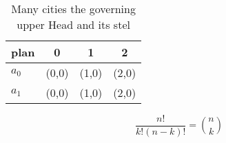 \documentclass[a4paper]{article}
\begin{document}
\begin{table}
\begin{adjustbox}{width=0.6\columnwidth}
\begin{tabular}{|l|l|l|l|}
\hline
\textbf{plan} & \multicolumn{1}{c|}{\textbf{0}} & \multicolumn{1}{c|}{\textbf{1}} & \multicolumn{1}{c|}{\textbf{2}} \\ \hline
\textbf{$a_0$}  & (0,0) & (1,0) & (2,0) \\ \hline
\textbf{$a_1$}  & (0,0) & (1,0) & (2,0) \\ \hline
\end{tabular}
\end{adjustbox}
\caption{Many cities the governing upper Head and its stel
}
\end{table}

\[ \frac{n!}{k!(n-k)!} = \binom{n}{k} \]
\end{document}
